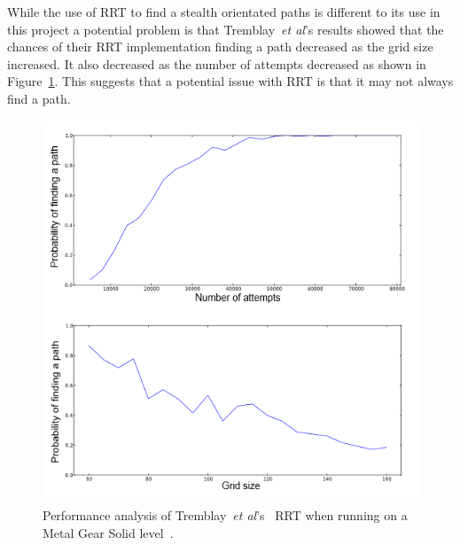 \documentclass[journal]{IEEEtran}
\begin{document}
	While the use of RRT to find a stealth orientated paths is different to its use in this project a potential problem is that Tremblay~\textit{et al}'s results showed that the chances of their RRT implementation finding a path decreased as the grid size increased. It also decreased as the number of attempts decreased as shown in Figure~\ref{TremblayRRT}.  This suggests that a potential issue with RRT is that it may not always find a path.
	
	\begin{figure}[h]
		\includegraphics[width=1.0\linewidth]{Tremblay2013.png}
		\caption{ Performance analysis of Tremblay~\textit{et al}'s~\cite{Tremblay2013} RRT when running on a Metal Gear Solid level~\cite{game:MetalGearSolid}.}
		\label{TremblayRRT}
	\end{figure} 
	
\end{document}
